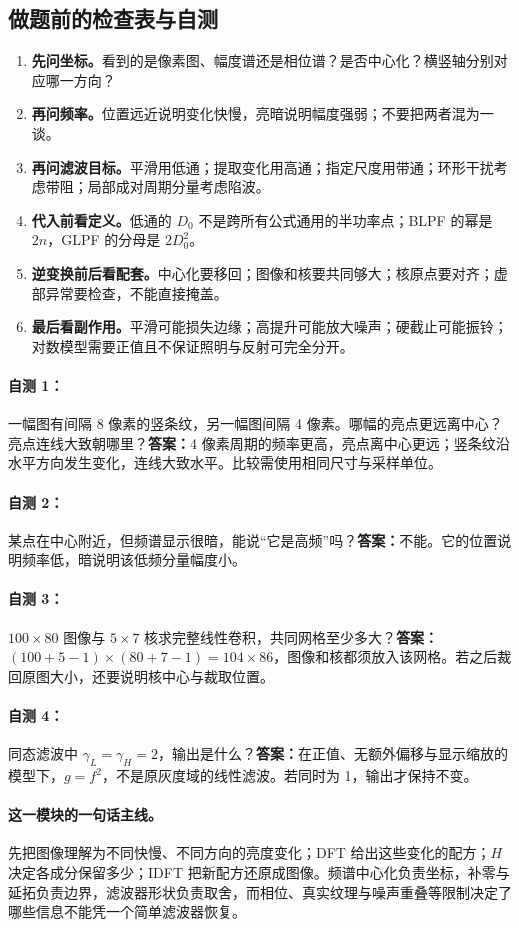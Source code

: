 \subsection{做题前的检查表与自测}

\begin{enumerate}[label=\arabic*.]
\item \textbf{先问坐标。}看到的是像素图、幅度谱还是相位谱？是否中心化？横竖轴分别对应哪一方向？
\item \textbf{再问频率。}位置远近说明变化快慢，亮暗说明幅度强弱；不要把两者混为一谈。
\item \textbf{再问滤波目标。}平滑用低通；提取变化用高通；指定尺度用带通；环形干扰考虑带阻；局部成对周期分量考虑陷波。
\item \textbf{代入前看定义。}低通的 $D_0$ 不是跨所有公式通用的半功率点；BLPF 的幂是 $2n$，GLPF 的分母是 $2D_0^2$。
\item \textbf{逆变换前后看配套。}中心化要移回；图像和核要共同够大；核原点要对齐；虚部异常要检查，不能直接掩盖。
\item \textbf{最后看副作用。}平滑可能损失边缘；高提升可能放大噪声；硬截止可能振铃；对数模型需要正值且不保证照明与反射可完全分开。
\end{enumerate}

\paragraph{自测 1：}一幅图有间隔 8 像素的竖条纹，另一幅图间隔 4 像素。哪幅的亮点更远离中心？亮点连线大致朝哪里？\quad\textbf{答案：}4 像素周期的频率更高，亮点离中心更远；竖条纹沿水平方向发生变化，连线大致水平。比较需使用相同尺寸与采样单位。

\paragraph{自测 2：}某点在中心附近，但频谱显示很暗，能说“它是高频”吗？\quad\textbf{答案：}不能。它的位置说明频率低，暗说明该低频分量幅度小。

\paragraph{自测 3：}$100\times80$ 图像与 $5\times7$ 核求完整线性卷积，共同网格至少多大？\quad\textbf{答案：}$(100+5-1)\times(80+7-1)=104\times86$，图像和核都须放入该网格。若之后裁回原图大小，还要说明核中心与裁取位置。

\paragraph{自测 4：}同态滤波中 $\gamma_L=\gamma_H=2$，输出是什么？\quad\textbf{答案：}在正值、无额外偏移与显示缩放的模型下，$g=f^2$，不是原灰度域的线性滤波。若同时为 1，输出才保持不变。

\paragraph{这一模块的一句话主线。}\quad
先把图像理解为不同快慢、不同方向的亮度变化；DFT 给出这些变化的配方；$H$ 决定各成分保留多少；IDFT 把新配方还原成图像。频谱中心化负责坐标，补零与延拓负责边界，滤波器形状负责取舍，而相位、真实纹理与噪声重叠等限制决定了哪些信息不能凭一个简单滤波器恢复。
